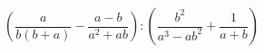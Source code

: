 \begin{ex}[type=expression]
	\begin{condition}
		\(\left( \dfrac{a}{b(b+a)}-\dfrac{a-b}{a^2+ab} \right):\left(\dfrac{b^2}{a^3-ab^2}+\dfrac{1}{a+b}\right)\)
	\end{condition}
\end{ex}